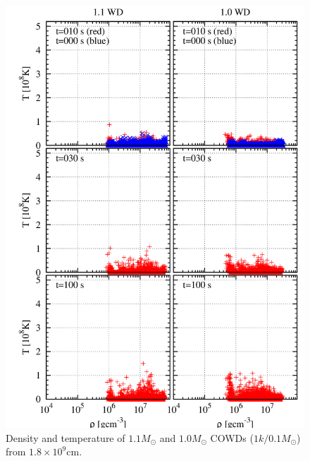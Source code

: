 \documentclass[fleqn,dvipdfmx]{article}
\begin{document}
\begin{figure}
  \begin{center}
    \includegraphics[width=14cm,bb=0 0 880 1240]{fig/bwd.1.8/draw.png}
  \end{center}
  \caption{Density and temperature of $1.1M_\odot$ and $1.0M_\odot$
    COWDs ($1k/0.1M_{\odot}$) from $1.8 \times 10^9$cm.}
\end{figure}
\end{document}

